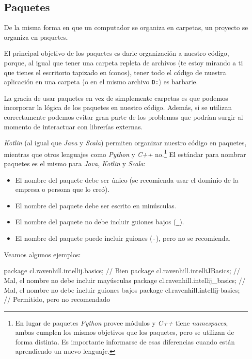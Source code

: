 
\subsection{Paquetes}
  
  De la misma forma en que un computador se organiza en carpetas, un proyecto se organiza en 
  paquetes.

  El principal objetivo de los paquetes es darle organización a nuestro código, porque, al igual 
  que tener una carpeta repleta de archivos (te estoy mirando a ti que tienes el escritorio 
  tapizado en íconos), tener todo el código de nuestra aplicación en una carpeta (o en el mismo 
  archivo \texttt{D:}) es barbarie.

  La gracia de usar paquetes en vez de simplemente carpetas es que podemos incorporar la lógica de
  los paquetes en nuestro código.
  Además, si se utilizan correctamente podemos evitar gran parte de los problemas que podrían
  surgir al momento de interactuar con librerías externas.

  \textit{Kotlin} (al igual que \textit{Java} y \textit{Scala}) permiten organizar nuestro código 
  en paquetes, mientras que otros lenguajes como \textit{Python} y \textit{C++} 
  no.\footnote{En lugar de paquetes \textit{Python} provee módulos y \textit{C++} tiene 
  \textit{namespaces}, ambas cumplen los mismos objetivos que los paquetes, pero se utilizan de 
  forma distinta. 
  Es importante informarse de esas diferencias cuando están aprendiendo un nuevo lenguaje.}
  El estándar para nombrar paquetes es el mismo para \textit{Java}, \textit{Kotlin} y 
  \textit{Scala}: 
  \begin{itemize}
    \item El nombre del paquete debe ser único (se recomienda usar el dominio de la empresa o 
      persona que lo creó).
    \item El nombre del paquete debe ser escrito en minúsculas.
    \item El nombre del paquete no debe incluir guiones bajos (\texttt{\_}).
    \item El nombre del paquete puede incluir guiones (\texttt{-}), pero no se recomienda.
  \end{itemize}

  Veamos algunos ejemplos:

  \begin{kotlin}
    package cl.ravenhill.intellij.basics; // Bien
    package cl.ravenhill.intelliJBasics; // Mal, el nombre no debe incluir mayúsculas
    package cl.ravenhill.intellij_basics; // Mal, el nombre no debe incluir guiones bajos
    package cl.ravenhill.intellij-basics; // Permitido, pero no recomendado
  \end{kotlin}

